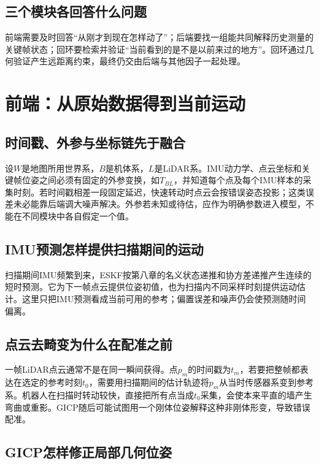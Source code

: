 \subsection{三个模块各回答什么问题}

前端需要及时回答“从刚才到现在怎样动了”；后端要找一组能共同解释历史测量的关键帧状态；回环要检索并验证“当前看到的是不是以前来过的地方”。回环通过几何验证产生远距离约束，最终仍交由后端与其他因子一起处理。

\section{前端：从原始数据得到当前运动}

\subsection{时间戳、外参与坐标链先于融合}

设$W$是地图所用世界系，$B$是机体系，$L$是LiDAR系。IMU动力学、点云坐标和关键帧位姿之间必须有固定的外参变换，如$T_{BL}$，并知道每个点及每个IMU样本的采集时刻。若时间戳相差一段固定延迟，快速转动时点云会按错误姿态投影；这类误差未必能靠后端调大噪声解决。外参若未知或待估，应作为明确参数进入模型，不能在不同模块中各自假定一个值。

\subsection{IMU预测怎样提供扫描期间的运动}

扫描期间IMU频繁到来，ESKF按第八章的名义状态递推和协方差递推产生连续的短时预测。它为下一帧点云提供位姿初值，也为扫描内不同采样时刻提供运动估计。这里只把IMU预测看成当前可用的参考；偏置误差和噪声仍会使预测随时间偏离。

\subsection{点云去畸变为什么在配准之前}

一帧LiDAR点云通常不是在同一瞬间获得。点$p_m$的时间戳为$t_m$，若要把整帧都表达在选定的参考时刻$t_0$，需要用扫描期间的估计轨迹将$p_m$从当时传感器系变到参考系。机器人在扫描时转动较快，直接把所有点当成$t_0$采集，会使本来平直的墙产生弯曲或重影。GICP随后可能试图用一个刚体位姿解释这种非刚体形变，导致错误配准。

\subsection{GICP怎样修正局部几何位姿}

